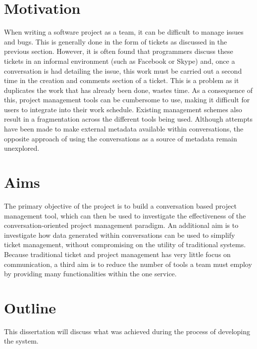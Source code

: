 \documentclass[a4paper]{l3proj}
\begin{document}
\section{Motivation}
\label{motivation}

When writing a software project as a team, it can be difficult to manage issues and bugs. This is generally done in the form of tickets as discussed in the previous section. However, it is often found that programmers discuss these tickets in an informal environment (such as Facebook or Skype) and, once a conversation is had detailing the issue, this work must be carried out a second time in the creation and comments section of a ticket. This is a problem as it duplicates the work that has already been done, wastes time. As a consequence of this, project management tools can be cumbersome to use, making it difficult for users to integrate into their work schedule. Existing management schemes also result in a fragmentation across the different tools being used. Although attempts have been made to make external metadata available within conversations, the opposite approach of using the conversations as a source of metadata remain unexplored.

\section{Aims}
\label{aims}

The primary objective of the project is to build a conversation based project management tool, which can then be used to investigate the effectiveness of the conversation-oriented project management paradigm. An additional aim is to investigate how data generated within conversations can be used to simplify ticket management, without compromising on the utility of traditional systems. Because traditional ticket and project management has very little focus on communication, a third aim is to reduce the number of tools a team must employ by providing many functionalities within the one service.

\section{Outline}
\label{outline}

This dissertation will discuss what was achieved during the process of developing the system.
\end{document}
